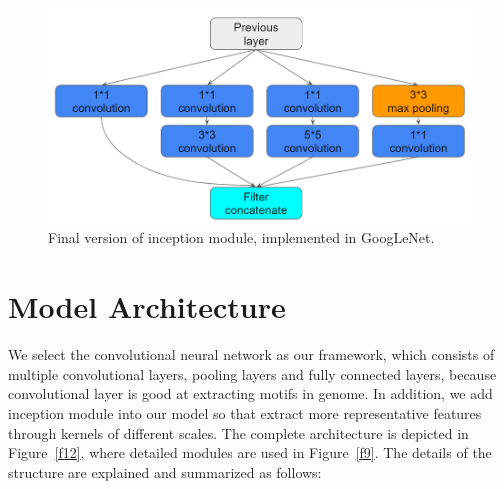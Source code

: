 \begin{figure}[H]
    \centering
    \includegraphics[width=0.8\columnwidth]{body/figure/figure8.png}
    \captionsetup{labelfont=bf}
    \renewcommand{\baselinestretch}{1.0}
    \caption[Final version of inception module]{Final version of inception module, implemented in GoogLeNet.}
    \label{f8}
\end{figure}

\section{Model Architecture} \label{method}
We select the convolutional neural network as our framework, which consists of multiple convolutional layers, pooling layers and fully connected layers, because convolutional layer is good at extracting motifs in genome. In addition, we add inception module into our model so that extract more representative features through kernels of different scales. The complete architecture is depicted in Figure~\ref{f12}, where detailed modules are used in Figure~\ref{f9}. The details of the structure are explained and summarized as follows:

